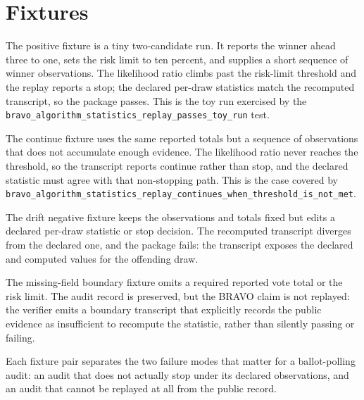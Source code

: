 \section{Fixtures}

The positive fixture is a tiny two-candidate run. It reports the winner ahead
three to one, sets the risk limit to ten percent, and supplies a short sequence
of winner observations. The likelihood ratio climbs past the
risk-limit threshold and the replay reports a stop; the declared per-draw
statistics match the recomputed transcript, so the package passes. This is the
toy run exercised by the \texttt{bravo\_algorithm\_statistics\_replay\_passes\_toy\_run}
test.

The continue fixture uses the same reported totals but a sequence of
observations that does not accumulate enough evidence. The likelihood ratio
never reaches the threshold, so the transcript reports continue rather than
stop, and the declared statistic must agree with that non-stopping path. This is
the case covered by
\texttt{bravo\_algorithm\_statistics\_replay\_continues\_when\_threshold\_is\_not\_met}.

The drift negative fixture keeps the observations and totals fixed but edits a
declared per-draw statistic or stop decision. The recomputed transcript diverges
from the declared one, and the package fails: the transcript exposes the
declared and computed values for the offending draw.

The missing-field boundary fixture omits a required reported vote total or the
risk limit. The audit record is preserved, but the BRAVO claim is not replayed:
the verifier emits a boundary transcript that explicitly records the public
evidence as insufficient to recompute the statistic, rather than silently
passing or failing.

Each fixture pair separates the two failure modes that matter for a
ballot-polling audit: an audit that does not actually stop under its declared
observations, and an audit that cannot be replayed at all from the public
record.
